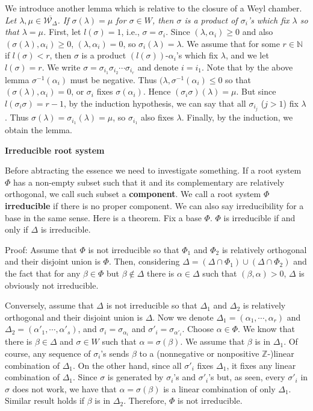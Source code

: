 \documentclass{article}
\newcommand{\NaN}{\mathbb{N}}
\newcommand{\InZ}{\mathbb{Z}}
\begin{document}
We introduce another lemma which is relative to the closure of a Weyl chamber.
\textit{Let $\lambda, \mu \in \overline{\mathcal{W}_\Delta}$.
If $\sigma(\lambda) = \mu$ for $\sigma \in W$, then $\sigma$ is a product of $\sigma_i$'s which fix $\lambda$ so that $\lambda = \mu$.}
First, let $l(\sigma) = 1$, i.e., $\sigma = \sigma_i$.
Since $(\lambda, \alpha_i) \ge 0$ and also $(\sigma(\lambda), \alpha_i) \ge 0$, $(\lambda, \alpha_i) = 0$, so $\sigma_i(\lambda) = \lambda$.
We assume that for some $r \in \NaN$ if $l(\sigma) < r$, then $\sigma$ is a product $(l(\sigma))$-$\alpha_i$'s which fix $\lambda$, and we let $l(\sigma) = r$.
We write $\sigma = \sigma_{i_1} \sigma_{i_2} \cdots \sigma_{i_r}$ and denote $i = i_1$.
Note that by the above lemma $\sigma^{-1}(\alpha_i)$ must be negative.
Thus $(\lambda, \sigma^{-1}(\alpha_i) \le 0$ so that $(\sigma(\lambda), \alpha_i) = 0$, or $\sigma_i$ fixes $\sigma(\alpha_i)$.
Hence $(\sigma_i \sigma)(\lambda) = \mu$.
But since $l(\sigma_i \sigma) = r - 1$, by the induction hypothesis, we can say that all $\sigma_{i_j}$ ($j>1$) fix $\lambda$.
Thus $\sigma(\lambda) = \sigma_{i_1}(\lambda) = \mu$, so $\sigma_{i_1}$ also fixes $\lambda$.
Finally, by the induction, we obtain the lemma.

\newpage

\textbf{Irreducible root system}

Before abtracting the essence we need to investigate something.
If a root system $\Phi$ has a non-empty subset such that it and its complementary are relatively orthogonal, we call such subset a \textbf{component}.
We call a root system $\Phi$ \textbf{irreducible} if there is no proper component.
We can also say irreducibility for a base in the same sense.
Here is a theorem.
Fix a base $\Phi$.
$\Phi$ is irreducible if and only if $\Delta$ is irreducible.

Proof: Assume that $\Phi$ is not irreducible so that $\Phi_1$ and $\Phi_2$ is relatively orthogonal and their disjoint union is $\Phi$.
Then, considering $\Delta = (\Delta \cap \Phi_1) \cup (\Delta \cap \Phi_2)$ and the fact that for any $\beta \in \Phi$ but $\beta \notin \Delta$ there is $\alpha \in \Delta$ such that $(\beta, \alpha) > 0$, $\Delta$ is obviously not irreducible.

Conversely, assume that $\Delta$ is not irreducible so that $\Delta_1$ and $\Delta_2$ is relatively orthogonal and their disjoint union is $\Delta$.
Now we denote $\Delta_1 = (\alpha_1, \cdots, \alpha_r)$ and $\Delta_2 = (\alpha'_1, \cdots, \alpha'_s)$, and $\sigma_i = \sigma_{\alpha_i}$ and $\sigma'_i = \sigma_{\alpha'_i}$.
Choose $\alpha \in \Phi$.
We know that there is $\beta \in \Delta$ and $\sigma \in W$ such that $\alpha = \sigma(\beta)$.
We assume that $\beta$ is in $\Delta_1$.
Of course, any sequence of $\sigma_i$'s sends $\beta$ to a (nonnegative or nonpositive $\InZ$-)linear combination of $\Delta_1$.
On the other hand, since all $\sigma'_i$ fixes $\Delta_1$, it fixes any linear combination of $\Delta_1$.
Since $\sigma$ is generated by $\sigma_i$'s and $\sigma'_i$'s but, as seen, every $\sigma'_i$ in $\sigma$ does not work, we have that $\alpha = \sigma(\beta)$ is a linear combination of only $\Delta_1$.
Similar result holds if $\beta$ is in $\Delta_2$.
Therefore, $\Phi$ is not irreducible.
\end{document}
